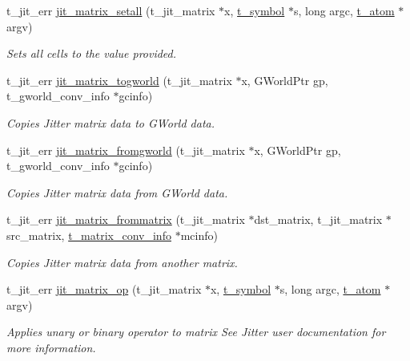 \begin{DoxyCompactItemize}
t\_\-jit\_\-err \hyperlink{group__matrixmod_ga8082cc74c3e4d5a68167e10d865217e1}{jit\_\-matrix\_\-setall} (t\_\-jit\_\-matrix $\ast$x, \hyperlink{structt__symbol}{t\_\-symbol} $\ast$s, long argc, \hyperlink{structt__atom}{t\_\-atom} $\ast$argv)
\begin{DoxyCompactList}\small\item\em Sets all cells to the value provided. \item\end{DoxyCompactList}\item 
t\_\-jit\_\-err \hyperlink{group__matrixmod_gac5ec23c849581a65c094654bbba41dee}{jit\_\-matrix\_\-togworld} (t\_\-jit\_\-matrix $\ast$x, GWorldPtr gp, t\_\-gworld\_\-conv\_\-info $\ast$gcinfo)
\begin{DoxyCompactList}\small\item\em Copies Jitter matrix data to GWorld data. \item\end{DoxyCompactList}\item 
t\_\-jit\_\-err \hyperlink{group__matrixmod_ga5413151392a8876a78cd2f66b4a23279}{jit\_\-matrix\_\-fromgworld} (t\_\-jit\_\-matrix $\ast$x, GWorldPtr gp, t\_\-gworld\_\-conv\_\-info $\ast$gcinfo)
\begin{DoxyCompactList}\small\item\em Copies Jitter matrix data from GWorld data. \item\end{DoxyCompactList}\item 
t\_\-jit\_\-err \hyperlink{group__matrixmod_gaec5dd25f1111bb4efab4b2e3fdced43e}{jit\_\-matrix\_\-frommatrix} (t\_\-jit\_\-matrix $\ast$dst\_\-matrix, t\_\-jit\_\-matrix $\ast$src\_\-matrix, \hyperlink{structt__matrix__conv__info}{t\_\-matrix\_\-conv\_\-info} $\ast$mcinfo)
\begin{DoxyCompactList}\small\item\em Copies Jitter matrix data from another matrix. \item\end{DoxyCompactList}\item 
t\_\-jit\_\-err \hyperlink{group__matrixmod_ga5f56aa2c21c39c60e7549beeb86a5120}{jit\_\-matrix\_\-op} (t\_\-jit\_\-matrix $\ast$x, \hyperlink{structt__symbol}{t\_\-symbol} $\ast$s, long argc, \hyperlink{structt__atom}{t\_\-atom} $\ast$argv)
\begin{DoxyCompactList}\small\item\em Applies unary or binary operator to matrix See Jitter user documentation for more information. \item\end{DoxyCompactList}\item 

\end{DoxyCompactItemize}
